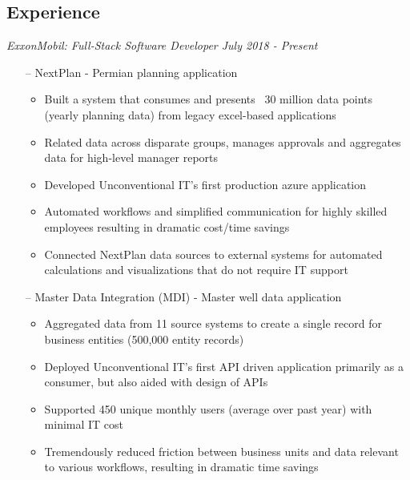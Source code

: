 \documentclass[line,overlapped,9pt]{res}
\begin{document}
\setlength\itemsep{.25em}
\address{Email: kllinzy1@gmail.com}
\address{Mobile: (918)440-3563}

\begin{resume}

  \section{Experience} {\sl ExxonMobil: Full-Stack Software Developer \hfill July 2018 - \sl Present}
                 \begin{itemize}   %
                 \item[--] NextPlan - Permian planning application
                   \begin{itemize}
                   \item Built a system that consumes and presents ~30 million data points (yearly planning data) from legacy excel-based applications
                   \item Related data across disparate groups, manages approvals and aggregates data for high-level manager reports
                   \item Developed Unconventional IT's first production azure application
                   \item Automated workflows and simplified communication for highly skilled employees resulting in dramatic cost/time savings
                   \item Connected NextPlan data sources to external systems for automated calculations and visualizations that do not require IT support
                   \end{itemize}
                 \item[--] Master Data Integration (MDI) - Master well data application
                   \begin{itemize}
                   \item Aggregated data from 11 source systems to create a single record for business entities (500,000 entity records) 
                   \item Deployed Unconventional IT's first API driven application primarily as a consumer, but also aided with design of APIs  
                   \item Supported 450 unique monthly users (average over past year) with minimal IT cost    
                   \item Tremendously reduced friction between business units and data relevant to various workflows, resulting in dramatic time savings

\end{itemize}
\end{itemize}
\end{resume}
\end{document}
